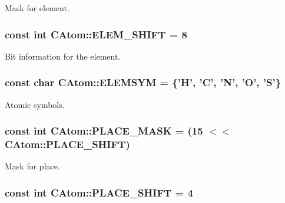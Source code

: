 Mask for element. 

\hypertarget{classCAtom_a8d1a901dcaeab90596ffacac7bc04f3d}{
\subsubsection[{E\-L\-E\-M\-\_\-\-S\-H\-I\-F\-T}]{\setlength{\rightskip}{0pt plus 5cm}const int C\-Atom\-::\-E\-L\-E\-M\-\_\-\-S\-H\-I\-F\-T = 8\hspace{0.3cm}{\ttfamily [static]}}}\label{classCAtom_a8d1a901dcaeab90596ffacac7bc04f3d}


Bit information for the element. 

\hypertarget{classCAtom_a4c2f1a2299fb0ffbdb1307f744591baf}{
\subsubsection[{E\-L\-E\-M\-S\-Y\-M}]{\setlength{\rightskip}{0pt plus 5cm}const char C\-Atom\-::\-E\-L\-E\-M\-S\-Y\-M = \{'{\bf H}', '{\bf C}', '{\bf N}', '{\bf O}', '{\bf S}'\}\hspace{0.3cm}{\ttfamily [static]}}}\label{classCAtom_a4c2f1a2299fb0ffbdb1307f744591baf}


Atomic symbols. 

\hypertarget{classCAtom_a03572c4dc279704a994647c54249a1f6}{
\subsubsection[{P\-L\-A\-C\-E\-\_\-\-M\-A\-S\-K}]{\setlength{\rightskip}{0pt plus 5cm}const int C\-Atom\-::\-P\-L\-A\-C\-E\-\_\-\-M\-A\-S\-K = (15 $<$$<${\bf C\-Atom\-::\-P\-L\-A\-C\-E\-\_\-\-S\-H\-I\-F\-T})\hspace{0.3cm}{\ttfamily [static]}}}\label{classCAtom_a03572c4dc279704a994647c54249a1f6}


Mask for place. 

\hypertarget{classCAtom_a86677e582ce1bbdd16d6af1807804aa0}{
\subsubsection[{P\-L\-A\-C\-E\-\_\-\-S\-H\-I\-F\-T}]{\setlength{\rightskip}{0pt plus 5cm}const int C\-Atom\-::\-P\-L\-A\-C\-E\-\_\-\-S\-H\-I\-F\-T = 4\hspace{0.3cm}{\ttfamily [static]}}}\label{classCAtom_a86677e582ce1bbdd16d6af1807804aa0}


